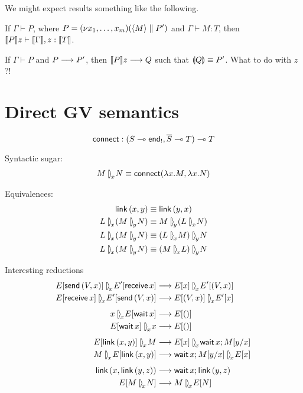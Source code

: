 \documentclass[orivec,envcountsame]{llncs}
\begin{document}
We might expect results something like the following.

\begin{theorem}
  If $\Gamma \vdash P$, where $P = (\nu x_1,\dots,x_m)(\langle M \rangle \parallel P')$ and $\Gamma
  \vdash M: T$, then $\llbracket P \rrbracket z \vdash \llbracket \Gamma \rrbracket, z:\llbracket T \rrbracket$.
\end{theorem}

\begin{theorem}
  If $\Gamma \vdash P$ and $P \longrightarrow P'$, then $\llbracket P \rrbracket z \longrightarrow Q$ such that $\llparenthesis Q \rrparenthesis
  \equiv P'$.  What to do with $z$?!
\end{theorem}

\section{Direct GV semantics}

\newcommand{\con}[3]{{#1} \mathbin{[\:\!\!\rangle}_{\!#2}\! {#3}}

\[
\mathsf{connect} : (S \multimap \mathsf{end}_!, \overline{S} \multimap T) \multimap T
\]

Syntactic sugar:
\begin{align*}
\con{M}{x}{N} &\equiv \mkwd{connect}(\lambda x.M, \lambda x.N) \\
\end{align*}

Equivalences:
\begin{align*}
\mkwd{link}\,(x,y) &\equiv \mkwd{link}\,(y,x) \\
\con{L}{x}{(\con{M}{y}{N})} &\equiv \con{M}{y}{(\con{L}{x}{N})} \\
\con{L}{x}{(\con{M}{y}{N})} &\equiv \con{(\con{L}{x}{M})}{y}{N} \\
\con{L}{x}{(\con{M}{y}{N})} &\equiv \con{(\con{M}{x}{L})}{y}{N} \\
\end{align*}

Interesting reductions
\begin{align*}
\con{E[\mkwd{send}\,(V,x)]}{x}{E'[\mkwd{receive}\,x]}
  &\rto \con{E[x]}{x}{E'[(V,x)]} \\
\con{E[\mkwd{receive}\,x]}{x}{E'[\mkwd{send}\,(V,x)]}
  &\rto \con{E[(V,x)]}{x}{E'[x]} \\[1ex]
\con{x}{x}{E[\mkwd{wait}\,x]}
  &\rto E[()] \\
\con{E[\mkwd{wait}\,x]}{x}{x}
  &\rto E[()] \\[1ex]
\con{E[\mkwd{link}\,(x,y)]}{x}{M}
  &\rto \con{E[x]}{x}{\mkwd{wait}\,x; M[y/x]} \\
\con{M}{x}{E[\mkwd{link}\,(x,y)]}
  &\rto \con{\mkwd{wait}\,x; M[y/x]}{x}{E[x]} \\[1ex]
\mkwd{link}\,(x,\mkwd{link}\,(y,z))
  &\rto \mkwd{wait}\,x; \mkwd{link}\,(y,z) \\
E[\con{M}{x}{N}]
  &\rto \con{M}{x}{E[N]} \\
\end{align*}
\end{document}
